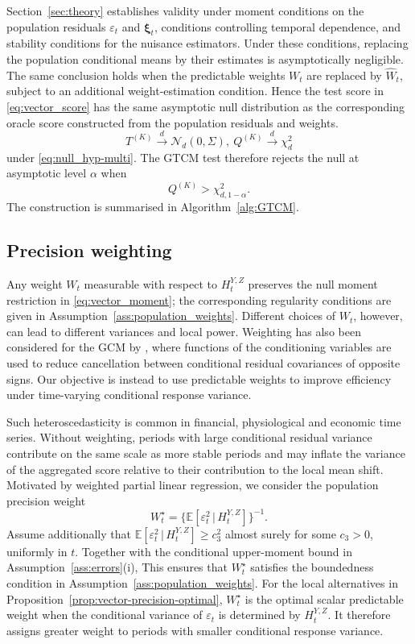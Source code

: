 \documentclass[12pt]{article}
\def\E{\mathbb{E}}
\newcommand\given{\,|\,}
\numberwithin{equation}{section}
\begin{document}
Section~\ref{sec:theory} establishes validity under moment conditions on the population residuals \(\varepsilon_t\) and \(\boldsymbol{\xi}_t\), conditions controlling temporal dependence, and stability conditions for the nuisance estimators. Under these conditions, replacing the population conditional means by their estimates is asymptotically negligible. The same conclusion holds when the predictable weights \(W_t\) are replaced by \(\hat W_t\), subject to an additional weight-estimation condition. Hence the test score in \eqref{eq:vector_score} has the same asymptotic null distribution as the corresponding oracle score constructed from the population residuals and weights.
\[
    T^{(K)}
    \xrightarrow{d}
    \mathcal N_d(0,\Sigma),
    ~
    Q^{(K)}
    \xrightarrow{d}
    \chi_d^2
\]
under \eqref{eq:null_hyp-multi}. The GTCM test therefore rejects the null at
asymptotic level \(\alpha\) when
\[
    Q^{(K)}>\chi^2_{d,1-\alpha}.
\]
The construction is summarised in Algorithm~\ref{alg:GTCM}.



\subsection{Precision weighting}
\label{sec:weights}

Any weight \(W_t\) measurable with respect to \(H_t^{Y,Z}\) preserves the null
moment restriction in \eqref{eq:vector_moment}; the corresponding regularity
conditions are given in Assumption~\ref{ass:population_weights}. Different
choices of \(W_t\), however, can lead to different variances and local power.
Weighting has also been considered for the GCM by
\citet{scheidegger2022weighted}, where functions of the conditioning
variables are used to reduce cancellation between conditional residual covariances of opposite signs. Our objective is instead to use predictable weights to improve efficiency under time-varying conditional response variance.

Such heteroscedasticity is common in financial, physiological and economic
time series. Without weighting, periods with large conditional residual
variance contribute on the same scale as more stable periods and may inflate
the variance of the aggregated score relative to their contribution to the
local mean shift. Motivated by weighted partial linear regression, we consider
the population precision weight
\begin{equation}
    W_t^\star
    =
    \big\{
        \E[
            \varepsilon_t^2
            \given H_t^{Y,Z}
        ]
    \big\}^{-1}.
    \label{eq:optimal_weight}
\end{equation}
Assume additionally that
\(\E[\varepsilon_t^2\given H_t^{Y,Z}]\geq c_3^2\) almost surely for
some \(c_3>0\), uniformly in \(t\). Together with the conditional
upper-moment bound in Assumption~\ref{ass:errors}(i), This ensures that \(W_t^\star\) satisfies the boundedness condition in Assumption~\ref{ass:population_weights}. For the local alternatives in Proposition~\ref{prop:vector-precision-optimal}, \(W_t^\star\) is the optimal scalar predictable weight when the conditional variance of \(\varepsilon_t\) is determined by \(H_t^{Y,Z}\). It therefore assigns greater weight to periods with smaller conditional response variance.
\end{document}
